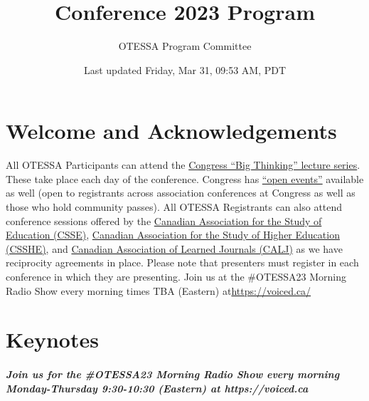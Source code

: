 \documentclass[
]{book}
\title{Conference 2023 Program}
\author{OTESSA Program Committee}
\date{Last updated Friday, Mar 31, 09:53 AM, PDT}
\begin{document}
\maketitle

{
\setcounter{tocdepth}{1}
\tableofcontents
}
\hypertarget{welcome-and-acknowledgements}{%
\chapter*{Welcome and Acknowledgements}\label{welcome-and-acknowledgements}}

All OTESSA Participants can attend the \href{https://www.federationhss.ca/en/congress/congress-2022/open-programming}{Congress ``Big Thinking'' lecture series}. These take place each day of the conference. Congress has \href{https://www.federationhss.ca/en/congress/congress-2022/calendar-open-events}{``open events''} available as well (open to registrants across association conferences at Congress as well as those who hold community passes).
All OTESSA Registrants can also attend conference sessions offered by the \href{https://csse-scee.ca/}{Canadian Association for the Study of Education (CSSE)}, \href{https://csshe-scees.ca/}{Canadian Association for the Study of Higher Education (CSSHE)}, and \href{https://www.calj-acrs.ca/}{Canadian Association of Learned Journals (CALJ)} as we have reciprocity agreements in place. Please note that presenters must register in each conference in which they are presenting.
Join us at the \#OTESSA23 Morning Radio Show every morning times TBA (Eastern) at\url{https://voiced.ca/}

\hypertarget{keynotes}{%
\chapter*{Keynotes}\label{keynotes}}

\begin{protip}
\hypertarget{join-us-for-the-otessa23-morning-radio-show-every-morning-monday-thursday-930-1030-eastern-at-httpsvoiced.ca}{%
\paragraph{Join us for the \#OTESSA23 Morning Radio Show every morning
Monday-Thursday 9:30-10:30 (Eastern) at
https://voiced.ca}\label{join-us-for-the-otessa23-morning-radio-show-every-morning-monday-thursday-930-1030-eastern-at-httpsvoiced.ca}}
\end{protip}
\end{document}

